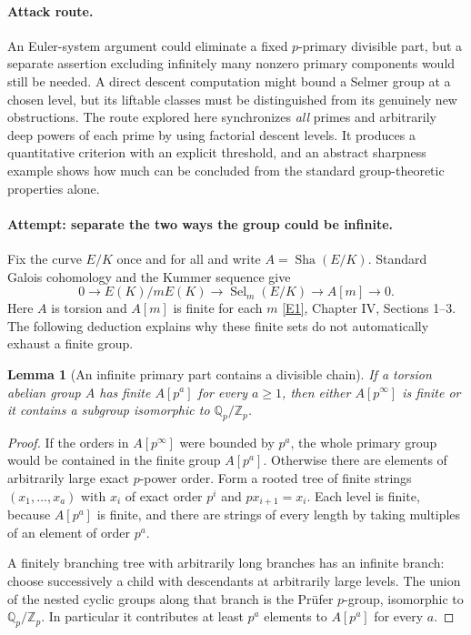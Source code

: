 \documentclass[11pt,a4paper]{article}
\newcommand{\Z}{\mathbb{Z}}
\newcommand{\Q}{\mathbb{Q}}
\newcommand{\eref}[2]{\hyperlink{extra:#1:#2}{[E#2]}}
\newtheorem{notebooklemma}{Lemma}[section]
\numberwithin{equation}{section}
\begin{document}
\paragraph{Attack route.}
An Euler-system argument could eliminate a fixed $p$-primary divisible part, but a separate assertion excluding infinitely many nonzero primary components would still be needed. A direct descent computation might bound a Selmer group at a chosen level, but its liftable classes must be distinguished from its genuinely new obstructions. The route explored here synchronizes \emph{all} primes and arbitrarily deep powers of each prime by using factorial descent levels. It produces a quantitative criterion with an explicit threshold, and an abstract sharpness example shows how much can be concluded from the standard group-theoretic properties alone.

\paragraph{Attempt: separate the two ways the group could be infinite.}
Fix the curve $E/K$ once and for all and write $A=\operatorname{Sha}(E/K)$. Standard Galois cohomology and the Kummer sequence give
\begin{equation}\label{r59:kummer}
 0\longrightarrow E(K)/mE(K)\longrightarrow
       \operatorname{Sel}_m(E/K)\longrightarrow A[m]\longrightarrow0.
\end{equation}
Here $A$ is torsion and $A[m]$ is finite for each $m$ \eref{59}{1}, Chapter IV, Sections 1--3. The following deduction explains why these finite sets do not automatically exhaust a finite group.

\begin{notebooklemma}[An infinite primary part contains a divisible chain]\label{r59:prufer}
If a torsion abelian group $A$ has finite $A[p^a]$ for every $a\geq1$, then either $A[p^\infty]$ is finite or it contains a subgroup isomorphic to $\Q_p/\Z_p$.
\end{notebooklemma}
\begin{proof}
If the orders in $A[p^\infty]$ were bounded by $p^a$, the whole primary group would be contained in the finite group $A[p^a]$. Otherwise there are elements of arbitrarily large exact $p$-power order. Form a rooted tree of finite strings $(x_1,\ldots,x_a)$ with $x_i$ of exact order $p^i$ and $px_{i+1}=x_i$. Each level is finite, because $A[p^a]$ is finite, and there are strings of every length by taking multiples of an element of order $p^a$.

A finitely branching tree with arbitrarily long branches has an infinite branch: choose successively a child with descendants at arbitrarily large levels. The union of the nested cyclic groups along that branch is the Pr\"ufer $p$-group, isomorphic to $\Q_p/\Z_p$. In particular it contributes at least $p^a$ elements to $A[p^a]$ for every $a$.
\end{proof}
\end{document}
